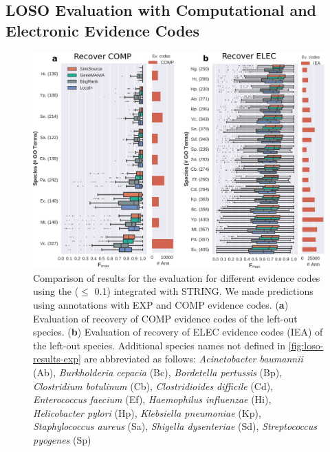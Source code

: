 \subsection{LOSO Evaluation with Computational and Electronic Evidence Codes}
\label{sec:loso-results-expc-comp-iea}

\begin{figure}[H]
    \centering
    \includegraphics[width=\textwidth]{figs/fig3-expc-comp-iea.pdf}
    \caption{
      Comparison of \fmax results for the \loso evaluation for different evidence codes using the \SSN (\eval $\le$ 0.1) integrated with STRING. We made predictions using annotations with EXP and COMP evidence codes.
      (\textbf{a}) Evaluation of recovery of COMP evidence codes of the left-out species.
      (\textbf{b}) Evaluation of recovery of ELEC evidence codes (IEA) of the left-out species.
      Additional species names not defined in \cref{fig:loso-results-exp} are abbreviated as follows:
      \textit{Acinetobacter baumannii} (Ab), 
      \textit{Burkholderia cepacia} (Bc), 
      \textit{Bordetella pertussis} (Bp), 
      \textit{Clostridium botulinum} (Cb),
      \textit{Clostridioides difficile} (Cd), 
      \textit{Enterococcus faecium} (Ef),
      \textit{Haemophilus influenzae} (Hi),
      \textit{Helicobacter pylori} (Hp), 
      \textit{Klebsiella pneumoniae} (Kp),
      \textit{Staphylococcus aureus} (Sa),
      \textit{Shigella dysenteriae} (Sd),
      \textit{Streptococcus pyogenes} (Sp)
    }
    \label{fig:loso-results-expc-comp-iea}
\end{figure}


